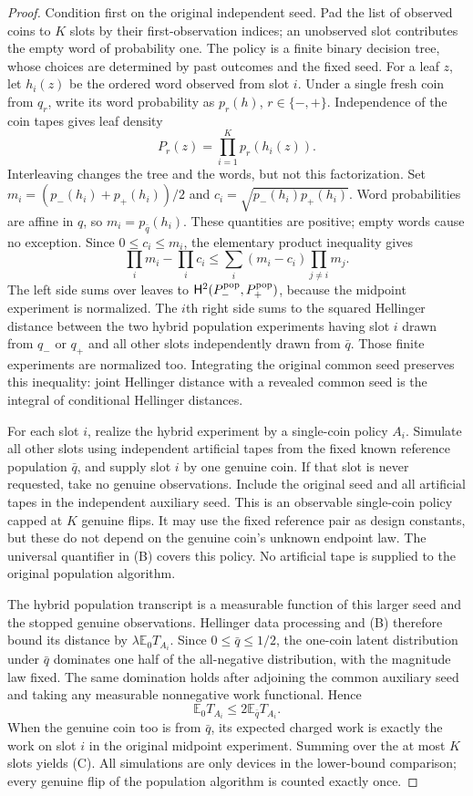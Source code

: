 \documentclass[11pt]{article}
\newcommand{\E}{\mathbb E}
\newcommand{\Hsq}{\mathsf H^2}
\begin{document}
\begin{proof}
Condition first on the original independent seed. Pad the list of observed
coins to $K$ slots by their first-observation indices; an unobserved slot
contributes the empty word of probability one. The policy is a finite binary
decision tree, whose choices are determined by past outcomes and the fixed
seed. For a leaf $z$, let $h_i(z)$ be the ordered word observed from slot $i$.
Under a single fresh coin from $q_r$, write its word probability as
$p_r(h)$, $r\in\{-,+\}$. Independence of the coin tapes gives leaf density
\[
 P_r(z)=\prod_{i=1}^Kp_r(h_i(z)).
\]
Interleaving changes the tree and the words, but not this factorization.
Set $m_i=(p_-(h_i)+p_+(h_i))/2$ and
$c_i=\sqrt{p_-(h_i)p_+(h_i)}$. Word probabilities are affine in $q$, so
$m_i=p_{\bar q}(h_i)$. These quantities are positive; empty words cause
no exception. Since $0\le c_i\le m_i$, the elementary product inequality
gives
\[
 \prod_i m_i-\prod_i c_i
   \le\sum_i(m_i-c_i)\prod_{j\ne i}m_j.                \tag{D}
\]
The left side sums over leaves to $\Hsq(P_-^{\rm pop},P_+^{\rm pop})$,
because the midpoint experiment is normalized. The $i$th right side sums
to the squared Hellinger distance between the two hybrid population
experiments having slot $i$ drawn from $q_-$ or $q_+$ and all other slots
independently drawn from $\bar q$. Those finite experiments are normalized
too. Integrating the original common seed preserves this inequality: joint
Hellinger distance with a revealed common seed is the integral of conditional
Hellinger distances.

For each slot $i$, realize the hybrid experiment by a single-coin policy $A_i$.
Simulate all other slots using independent artificial tapes from the fixed
known reference population $\bar q$, and supply slot $i$ by one genuine
coin. If that slot is never requested, take no genuine observations. Include
the original seed and all artificial tapes in the independent auxiliary seed.
This is an observable single-coin policy capped at $K$ genuine flips.
It may use the fixed reference pair as design constants, but these do not
depend on the genuine coin's unknown endpoint law. The universal quantifier
in (B) covers this policy. No artificial tape is supplied to the original
population algorithm.

The hybrid population transcript is a measurable function of this larger
seed and the stopped genuine observations. Hellinger data processing and
(B) therefore bound its distance by $\lambda\E_0T_{A_i}$.
Since $0\le\bar q\le1/2$, the one-coin latent distribution under $\bar q$
dominates one half of the all-negative distribution, with the magnitude
law fixed. The same domination holds after adjoining the common auxiliary
seed and taking any measurable nonnegative work functional. Hence
\[
 \E_0 T_{A_i}\le2\E_{\bar q}T_{A_i}.
\]
When the genuine coin too is from $\bar q$, its expected charged work is
exactly the work on slot $i$ in the original midpoint experiment. Summing
over the at most $K$ slots yields (C). All simulations are only devices in
the lower-bound comparison; every genuine flip of the population algorithm
is counted exactly once.
\end{proof}
\end{document}
